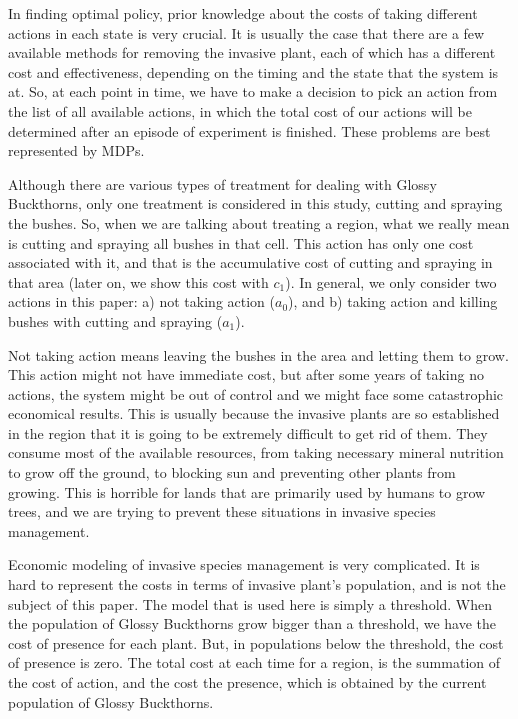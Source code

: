 \documentclass{article}
\theoremstyle{remark}
\theoremstyle{remark}
\theoremstyle{remark}
\theoremstyle{remark}
\theoremstyle{remark}
\theoremstyle{remark}
\begin{document}
In finding optimal policy, prior knowledge about the costs of taking different actions in each state is very crucial. It is usually the case that there are a few available methods for removing the invasive plant, each of which has a different cost and effectiveness, depending on the timing and the state that the system is at. So, at each point in time, we have to make a decision to pick an action from the list of all available actions, in which the total cost of our actions will be determined after an episode of experiment is finished. These problems are best represented by MDPs.

Although there are various types of treatment for dealing with Glossy Buckthorns, only one treatment is considered in this study, cutting and spraying the bushes. So, when we are talking about treating a region, what we really mean is cutting and spraying all bushes in that cell. This action has only one cost associated with it, and that is the accumulative cost of cutting and spraying in that area (later on, we show this cost with $c_1$). In general, we only consider two actions in this paper: a) not taking action ($a_0$), and b) taking action and killing bushes with cutting and spraying ($a_1$).

Not taking action means leaving the bushes in the area and letting them to grow. This action might not have immediate cost, but after some years of taking no actions, the system might be out of control and we might face some catastrophic economical results. This is usually because the invasive plants are so established in the region that it is going to be extremely difficult to get rid of them. They consume most of the available resources, from taking necessary mineral nutrition to grow off the ground, to blocking sun and preventing other plants from growing. This is horrible for lands that are primarily used by humans to grow trees, and we are trying to prevent these situations in invasive species management.

Economic modeling of invasive species management is very complicated. It is hard to represent the costs in terms of invasive plant's population, and is not the subject of this paper. The model that is used here is simply a threshold. When the population of Glossy Buckthorns grow bigger than a threshold, we have the cost of presence for each plant. But, in populations below the threshold, the cost of presence is zero. The total cost at each time for a region, is the summation of the cost of action, and the cost the presence, which is obtained by the current population of Glossy Buckthorns.
\end{document}
